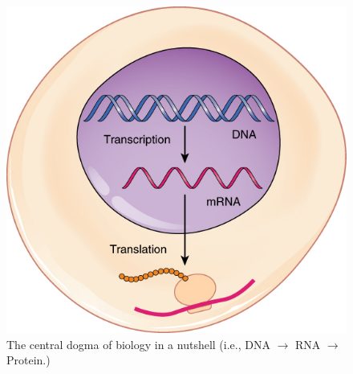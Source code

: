 

\long{}





\flushleft

\begin{figure}[ht!]
	\begin{center}
	 \includegraphics[scale=.5]{graphics/dogma.jpg}
	\end{center}
	\caption{The central dogma of biology in a nutshell (i.e., DNA $\to$ RNA $\to$ Protein.)}
	\label{fig:dogma}
\end{figure}






